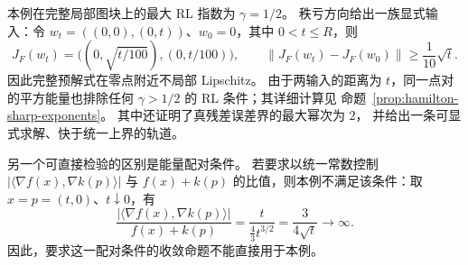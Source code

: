 本例在完整局部图块上的最大 RL 指数为 $\gamma=1/2$。
秩亏方向给出一族显式输入：令
$w_t=((0,0),(0,t))$、$w_0=0$，其中 $0<t\le R$，则
\[
 J_F(w_t)=\bigl((0,\sqrt{t/100}),(0,t/100)\bigr),\qquad
 \|J_F(w_t)-J_F(w_0)\|\ge\frac1{10}\sqrt t.
\]
因此完整预解式在零点附近不局部 Lipschitz。
由于两输入的距离为 $t$，同一点对的平方能量也排除任何
$\gamma>1/2$ 的 RL 条件；其详细计算见
命题~\ref{prop:hamilton-sharp-exponents}。
其中还证明了真残差误差界的最大幂次为 $2$，
并给出一条可显式求解、快于统一上界的轨道。

另一个可直接检验的区别是能量配对条件。
若要求以统一常数控制
$|\langle\nabla f(x),\nabla k(p)\rangle|$
与 $f(x)+k(p)$ 的比值，则本例不满足该条件：取
$x=p=(t,0)$、$t\downarrow0$，有
\[
 \frac{|\langle\nabla f(x),\nabla k(p)\rangle|}{f(x)+k(p)}
 =\frac{t}{\frac43t^{3/2}}
 =\frac3{4\sqrt t}\longrightarrow\infty.
\]
因此，要求这一配对条件的收敛命题不能直接用于本例。
